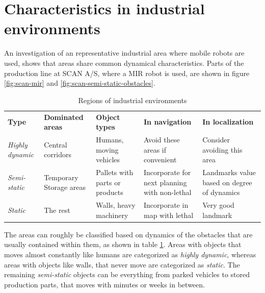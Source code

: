 \section{Characteristics in industrial environments}
\label{characteristics_in_industrial_environments}
An investigation of an representative industrial area where mobile robots are used, shows that areas share common dynamical characteristics. Parts of the production line at SCAN A/S, where a MIR robot is used, are shown in figure \ref{fig:scan-mir} and \ref{fig:scan-semi-static-obstacles}.

\begin{table}[htbp]
	\caption{Regions of industrial environments}
	\label{tab:regions_of_industrial_environments}
	\begin{center}
		\begin{tabular}{p{} | p{2.6cm} | p{2.6cm} | p{2.6cm} | p{2.6cm}}
			\toprule
			\textbf{Type} & \textbf{Dominated areas} & \textbf{Object types} & \textbf{In navigation} & \textbf{In localization} \\ 
			\rowcolor[gray]{0.925}
			\textit{Highly dynamic} & Central corridors & Humans, moving vehicles & Avoid these areas if convenient & Consider avoiding this area \\

			\textit{Semi-static} & Temporary Storage areas & Pallets with parts or products & Incorporate for next planning with non-lethal & Landmarks value based on degree of dynamics \\ 
			\rowcolor[gray]{0.925}
			\textit{Static} & The rest & Walls, heavy machinery & Incorporate in map with lethal & Very good landmark \\			
			\bottomrule
		\end{tabular} 
	\end{center}
\end{table}

The areas can roughly be classified based on dynamics of the obstacles that are usually contained within them, as shown in table \ref{tab:regions_of_industrial_environments}. Areas with objects that moves almost constantly like humans are categorized as \textit{highly dynamic}, whereas areas with objects like walls, that never move are categorized as \textit{static}. The remaining \textit{semi-static} objects can be everything from parked vehicles to stored production parts, that moves with minutes or weeks in between. 

